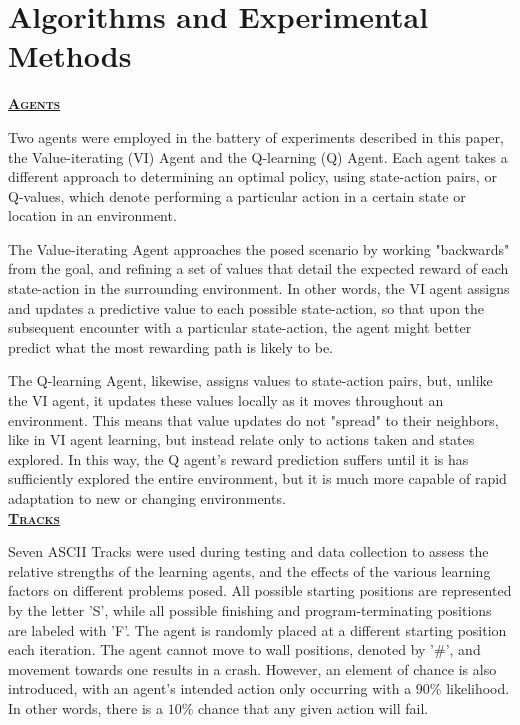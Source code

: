 \documentclass[12pt, letter]{article}
\newlength{\remaining}
\newcommand{\titleline}[1]{%
\setlength{\remaining}{\textwidth-\widthof{\textsc{#1}}}
\noindent\underline{\textsc{\textbf{#1}}\hspace*{\remaining}}\par}
\begin{document}
\section{Algorithms and Experimental Methods}
\titleline{Agents}
Two agents were employed in the battery of experiments described in this paper, the Value-iterating (VI) Agent and the Q-learning (Q) Agent.  Each agent takes a different approach to determining an optimal policy, using state-action pairs, or Q-values, which denote performing a particular action in a certain state or location in an environment.

The Value-iterating Agent approaches the posed scenario by working "backwards" from the goal, and refining a set of values that detail the expected reward of each state-action in the surrounding environment.  In other words, the VI agent assigns and updates a predictive value to each possible state-action, so that upon the subsequent encounter with a particular state-action, the agent might better predict what the most rewarding path is likely to be.

The Q-learning Agent, likewise, assigns values to state-action pairs, but, unlike the VI agent, it updates these values locally as it moves throughout an environment.  This means that value updates do not "spread" to their neighbors, like in VI agent learning, but instead relate only to actions taken and states explored.  In this way, the Q agent's reward prediction suffers until it is has sufficiently explored the entire environment, but it is much more capable of rapid adaptation to new or changing environments.\\

\clearpage
\titleline{Tracks}

Seven ASCII Tracks were used during testing and data collection to assess the relative strengths of the learning agents, and the effects of the various learning factors on different problems posed.  All possible starting positions are represented by the letter 'S', while all possible finishing and program-terminating positions are labeled with 'F'.  The agent is randomly placed at a different starting position each iteration.  The agent cannot move to wall positions, denoted by '\#', and movement towards one results in a crash.  However, an element of chance is also introduced, with an agent's intended action only occurring with a $90\%$ likelihood.  In other words, there is a $10\%$ chance that any given action will fail.
\end{document}
